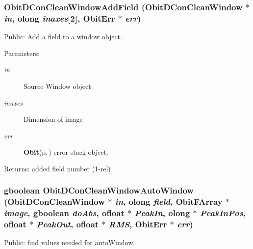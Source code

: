 \subsubsection{ Obit\-DCon\-Clean\-Window\-Add\-Field ({\bf Obit\-DCon\-Clean\-Window} $\ast$ {\em in}, {\bf olong} {\em inaxes}[2], {\bf Obit\-Err} $\ast$ {\em err})}\label{ObitDConCleanWindow_8c_a32}


Public: Add a field to a window object. 

\begin{Desc}
\item[Parameters:]
\begin{description}
\item[{\em in}]Source Window object \item[{\em inaxes}]Dimension of image \item[{\em err}]{\bf Obit}{\rm (p.\,\pageref{structObit})} error stack object. \end{description}
\end{Desc}
\begin{Desc}
\item[Returns:]added field number (1-rel) \end{Desc}
\subsubsection{\setlength{\rightskip}{0pt plus 5cm}gboolean Obit\-DCon\-Clean\-Window\-Auto\-Window ({\bf Obit\-DCon\-Clean\-Window} $\ast$ {\em in}, {\bf olong} {\em field}, {\bf Obit\-FArray} $\ast$ {\em image}, gboolean {\em do\-Abs}, {\bf ofloat} $\ast$ {\em Peak\-In}, {\bf olong} $\ast$ {\em Peak\-In\-Pos}, {\bf ofloat} $\ast$ {\em Peak\-Out}, {\bf ofloat} $\ast$ {\em RMS}, {\bf Obit\-Err} $\ast$ {\em err})}\label{ObitDConCleanWindow_8c_a30}


Public: find values needed for auto\-Window. 

